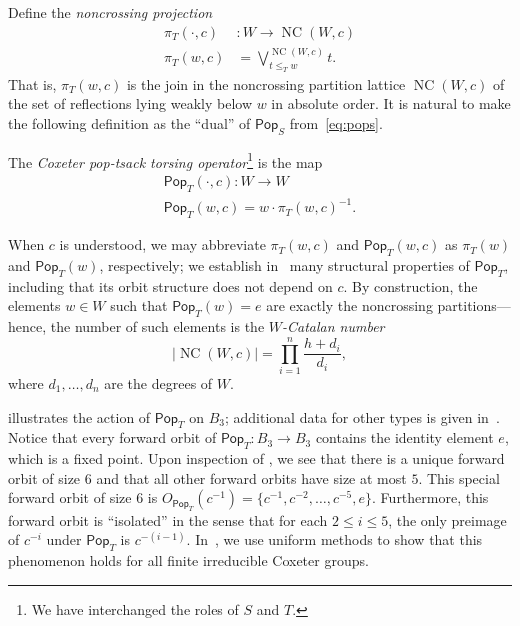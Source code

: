 \documentclass[ALCO,ThmDefs,Unicode,epreuves]{cedram}
\newcommand{\darkblue}{\color{darkblue}}
\newcommand{\defn}[1]{\emph{\darkblue #1}}
\newcommand{\pop}{\mathsf{Pop}}
\DeclareMathOperator{\NC}{NC}
\begin{document}
Define the \defn{noncrossing projection}
\begin{align}\label{EqNCProj}
\pi_T(\cdot,c)&:W \to \NC(W,c) \nonumber\\
\pi_T(w,c) &= \bigvee_{t \leq_T w}^{\NC(W,c)} t.
\end{align}
That is, $\pi_T(w,c)$ is the join in the noncrossing partition lattice $\NC(W,c)$ of the set of reflections lying weakly below $w$ in absolute order.  It is natural to make the following definition as the ``dual'' of $\pop_S$ from~\eqref{eq:pops}.

\begin{defi}
\label{def:dual_pop_stack}
The \defn{Coxeter pop-tsack torsing operator}\footnote{We have interchanged the roles of $S$ and $T$.} is the map
\begin{gather*}
 \pop_T(\cdot,c):W\to W \nonumber \\
\pop_T(w,c) = w \cdot \pi_T(w,c)^{-1}.
\end{gather*}
\end{defi}

When $c$ is understood, we may abbreviate $\pi_T(w,c)$ and $\pop_T(w,c)$ as $\pi_T(w)$ and $\pop_T(w)$, respectively; we establish in~ many structural properties of $\pop_T$, including that its orbit structure does not depend on $c$.  
By construction, the elements $w\in W$ such that $\pop_T(w)=e$ are exactly the noncrossing partitions---hence, the number of such elements is the \defn{$W$-Catalan number} 
\[
\left|\NC(W,c)\right|=\prod_{i=1}^n \frac{h+d_i}{d_i},
\]
 where $d_1,\ldots,d_n$ are the degrees of $W$.

 illustrates the action of $\pop_T$ on $B_3$; additional data for other types is given in~.  Notice that every forward orbit of $\pop_T:B_3\to B_3$ contains the identity element $e$, which is a fixed point.  
Upon inspection of , we see that there is a unique forward orbit of size $6$ and that all other forward orbits have size at most $5$. This special forward orbit of size $6$ is $O_{\pop_T}(c^{-1})=\{c^{-1},c^{-2},\ldots,c^{-5},e\}$. Furthermore, this forward orbit is ``isolated'' in the sense that for each $2\leq i\leq 5$, the only preimage of $c^{-i}$ under $\pop_T$ is $c^{-(i-1)}$. In~, we use uniform methods to show that this phenomenon holds for all finite irreducible Coxeter groups.
\end{document}
